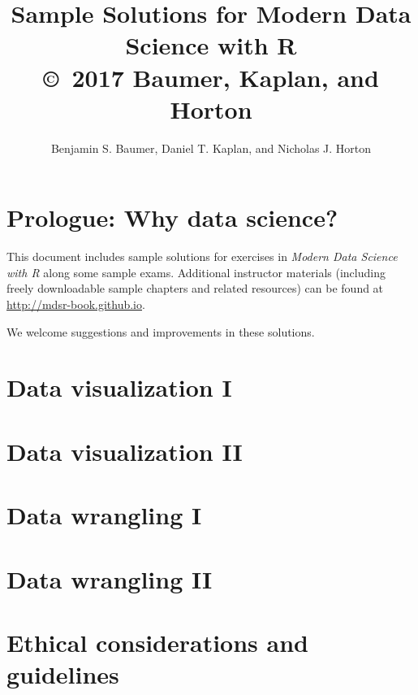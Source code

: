 \documentclass[oneside]{book}
\numberwithin{Answer}{chapter}
\numberwithin{Exercise}{chapter}
\begin{document}
\title{ Sample Solutions for Modern Data Science with R
  \\ {\small \copyright\ 2017 Baumer, Kaplan, and Horton }}
\author{Benjamin S. Baumer, Daniel T. Kaplan, and Nicholas J. Horton}

\maketitle 

\frontmatter
\tableofcontents
%
\mainmatter
{}



\pagestyle{headings}





\chapter{Prologue: Why data science?}

This document includes sample solutions for exercises in \emph{Modern Data Science with R} along some sample exams.
Additional instructor materials (including freely downloadable sample chapters and related resources) can be found at \url{http://mdsr-book.github.io}.  

We welcome
suggestions and improvements in these solutions.

\chapter{Data visualization I}


\chapter{Data visualization II}


\chapter{Data wrangling I}


\chapter{Data wrangling II}


\chapter{Ethical considerations and guidelines}

\end{document}
